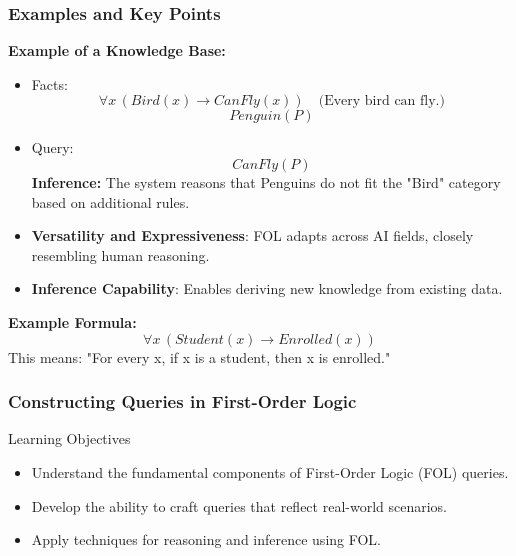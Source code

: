 \documentclass[aspectratio=169]{beamer}
\begin{document}
\begin{frame}[fragile]
    \frametitle{Examples and Key Points}
    \textbf{Example of a Knowledge Base:}
    
    \begin{itemize}
        \item Facts:
            \begin{equation}
            \forall x \, (Bird(x) \rightarrow CanFly(x)) \quad \text{(Every bird can fly.)}
            \end{equation}
            \begin{equation}
            Penguin(P) 
            \end{equation}
        
        \item Query:
            \begin{equation}
            CanFly(P) 
            \end{equation}
            \textbf{Inference:} The system reasons that Penguins do not fit the "Bird" category based on additional rules.
    
        \item \textbf{Versatility and Expressiveness}: FOL adapts across AI fields, closely resembling human reasoning.
        
        \item \textbf{Inference Capability}: Enables deriving new knowledge from existing data.
    \end{itemize}
    
    \textbf{Example Formula:}
    \begin{equation}
    \forall x \, (Student(x) \rightarrow Enrolled(x))
    \end{equation}
    This means: "For every x, if x is a student, then x is enrolled."
\end{frame}

\begin{frame}[fragile]
    \frametitle{Constructing Queries in First-Order Logic}
    \begin{block}{Learning Objectives}
        \begin{itemize}
            \item Understand the fundamental components of First-Order Logic (FOL) queries.
            \item Develop the ability to craft queries that reflect real-world scenarios.
            \item Apply techniques for reasoning and inference using FOL.
        \end{itemize}
    \end{block}
\end{frame}
\end{document}
